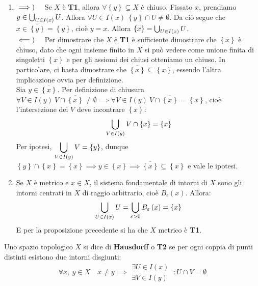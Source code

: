 \begin{demonstration}
\begin{enumerate}[label=\Roman*]
\item $\implies)\quad$ Se $X$ è \textbf{T1}, allora $\forall \left\{y\right\}\subseteq X$ è chiuso. Fissato $x$, prendiamo $y \in \mathop{{\bigcup}}\displaylimits_{U\in I\left(x\right)}U$. Allora $\forall U\in I\left(x\right)\ \left\{y\right\}\cap U\neq \emptyset$. Da ciò segue che $x\in\overline{\left\{y\right\}}=\left\{y\right\}$, cioè $y=x$. Allora $\left\{x\right\}=\mathop{{\bigcup}}\displaylimits_{U\in I\left(x\right)}U$.\\
$\impliedby)\quad$ Per dimostrare che $X$ è \textbf{T1} è sufficiente dimostrare che $\left\{x\right\}$ è chiuso, dato che ogni insieme finito in $X$ si può vedere come unione finita di singoletti $\left\{x\right\}$ e per gli assiomi dei chiusi otteniamo un chiuso. In particolare, ci basta dimostrare che $\overline{\left\{x\right\}}\subseteq \left\{x\right\}$, essendo l'altra implicazione ovvia per definizione.\\
Sia $y\in\overline{\left\{x\right\}}$. Per definizione di chiusura $\forall V\in I\left(y\right)\ V\cap\overline{\left\{x\right\}}\neq\emptyset\implies \forall V\in I\left(y\right)\ V\cap\overline{\left\{x\right\}}=\left\{x\right\}$, cioè l'intersezione dei $V$ deve incontrare $\left\{x\right\}$:
\begin{equation*}
\mathop{{\bigcup}}\displaylimits_{V\in I\left(y\right)}V\cap\left\{x\right\}=\left\{x\right\}
\end{equation*}
Per ipotesi, $\displaystyle \mathop{{\bigcup}}\displaylimits_{V\in I\left(y\right)}V=\left\{y\right\}$, dunque $\left\{y\right\}\cap \left\{x\right\}=\left\{x\right\}\implies y\in\left\{x\right\}\implies\overline{\left\{x\right\}}\subseteq \left\{x\right\}$ e vale le ipotesi.
\item Se $X$ è metrico e $x\in X$, il sistema fondamentale di intorni di $X$ sono gli intorni centrati in $X$ di raggio arbitrario, cioè $B_{\epsilon}\left(x\right)$. Allora:
\begin{equation*}
\mathop{{\bigcup}}\displaylimits_{U\in I\left(x\right)}U=\mathop{{\bigcup}}\displaylimits_{\varepsilon > 0}B_{\varepsilon}\left(x\right)=\left\{x\right\}
\end{equation*}
E per la proposizione precedente si ha che $X$ metrico è \textbf{T1}.
\end{enumerate}
\end{demonstration}
\begin{define}
Uno spazio topologico $X$ si dice di \textbf{Hausdorff} o \textbf{T2} se per ogni coppia di punti distinti esistono due intorni disgiunti:
\begin{equation}
	\forall x,\ y\in X\quad x\neq y\implies
	\begin{array}{l}
		\exists U\in I\left(x\right)\\
		\exists V\in I\left(y\right)
	\end{array}
\ \colon U\cap V=\emptyset
\end{equation}
\end{define}
